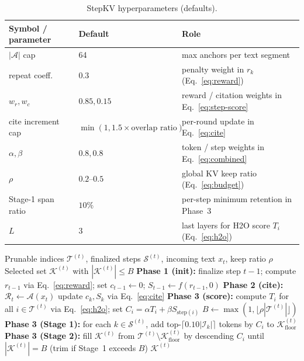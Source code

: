 \documentclass[11pt]{article}
\begin{document}
\begin{table}[t]
\centering
\caption{StepKV hyperparameters (defaults).}
\label{tab:stepkv-hparams}
\small
\begin{tabular}{@{}lll@{}}
\toprule
Symbol / parameter & Default & Role \\
\midrule
$|\mathcal{A}|$ cap & 64 & max anchors per text segment \\
repeat coeff. & $0.3$ & penalty weight in $r_k$ (Eq.~\eqref{eq:reward}) \\
$w_r, w_c$ & $0.85, 0.15$ & reward / citation weights in Eq.~\eqref{eq:step-score} \\
cite increment cap & $\min(1, 1.5 \times \text{overlap ratio})$ & per-round update in Eq.~\eqref{eq:cite} \\
$\alpha, \beta$ & $0.8, 0.8$ & token / step weights in Eq.~\eqref{eq:combined} \\
$\rho$ & $0.2$--$0.5$ & global KV keep ratio (Eq.~\eqref{eq:budget}) \\
Stage-1 span ratio & $10\%$ & per-step minimum retention in Phase~3 \\
$L$ & $3$ & last layers for H2O score $T_i$ (Eq.~\eqref{eq:h2o}) \\
\bottomrule
\end{tabular}
\end{table}

\begin{algorithm}[t]
\caption{StepKV cache selection at step boundary $t$}
\label{alg:stepkv}
\begin{algorithmic}[1]
\Require Prunable indices $\mathcal{T}^{(t)}$, finalized steps $\mathcal{S}^{(t)}$, incoming text $x_t$, keep ratio $\rho$
\Ensure Selected set $\mathcal{K}^{(t)}$ with $|\mathcal{K}^{(t)}|\le B$
\State \textbf{Phase 1 (init):} finalize step $t{-}1$; compute $r_{t-1}$ via Eq.~\eqref{eq:reward}; set $c_{t-1}\leftarrow 0$; $S_{t-1}\leftarrow f(r_{t-1},0)$
\State \textbf{Phase 2 (cite):} $\mathcal{R}_t\leftarrow\mathcal{A}(x_t)$
        \State update $c_k,S_k$ via Eq.~\eqref{eq:cite}
    \EndIf
\EndFor
\State \textbf{Phase 3 (score):} compute $T_i$ for all $i\in\mathcal{T}^{(t)}$ via Eq.~\eqref{eq:h2o}; set $C_i=\alpha T_i+\beta S_{\mathrm{step}(i)}$
\State $B\leftarrow\max(1,\lfloor \rho|\mathcal{T}^{(t)}|\rfloor)$
\State \textbf{Phase 3 (Stage 1):} for each $k\in\mathcal{S}^{(t)}$, add top-$\lceil 0.10|\mathcal{I}_k|\rceil$ tokens by $C_i$ to $\mathcal{K}^{(t)}_{\mathrm{floor}}$
\State \textbf{Phase 3 (Stage 2):} fill $\mathcal{K}^{(t)}$ from $\mathcal{T}^{(t)}\setminus\mathcal{K}^{(t)}_{\mathrm{floor}}$ by descending $C_i$ until $|\mathcal{K}^{(t)}|=B$ (trim if Stage~1 exceeds $B$)
\State \Return $\mathcal{K}^{(t)}$
\end{algorithmic}
\end{algorithm}
\end{document}
